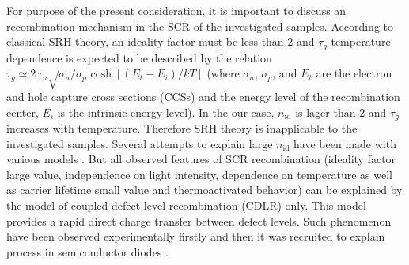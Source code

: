 \documentclass[aip,jap, amsmath,amssymb,reprint]{revtex4-1}
\begin{document}
For purpose of the present consideration, it is important to discuss an recombination mechanism in the SCR of the investigated samples.
According to classical SRH theory, an ideality factor must be less than 2 and
$\tau_g$ temperature dependence is expected \cite{TAUg:Schroder,TAUg:Aharoni} to be described by the relation  $\tau_g\simeq2\,\tau_n\sqrt{\sigma_n/\sigma_p}\cosh\left[\left(E_t-E_i\right)/kT\right]$
(where $\sigma_n$, $\sigma_p$, and  $E_t$ are the electron and hole capture cross sections (CCSs) and the energy  level of  the  recombination  center,
$E_i$  is the  intrinsic  energy level).
In the our case, $n_{\mathrm{id}}$ is lager than 2 and $\tau_g$ increases with temperature.
Therefore SRH theory is inapplicable to the investigated samples.
Several attempts to explain large $n_{\mathrm{id}}$ have been made with various models \cite{Heide,Beier,Shah,Kaminski_n}.
But all observed features of SCR recombination (ideality factor large value, independence on light intensity, dependence on temperature
as well as carrier lifetime small value and thermoactivated behavior) can be explained by the model of coupled defect level recombination (CDLR) \cite{CDLR:JAP1995,CDLR:JAP} only.
This model provides a rapid  direct  charge  transfer  between  defect levels.
Such phenomenon have been observed experimentally firstly \cite{DAPR:Chen1991,DAPR:Chen1994} and then it was recruited to explain process in semiconductor diodes \cite{CDLR:JAP1995,CDLR:JAP,CDLR:SSP}.
\end{document}
